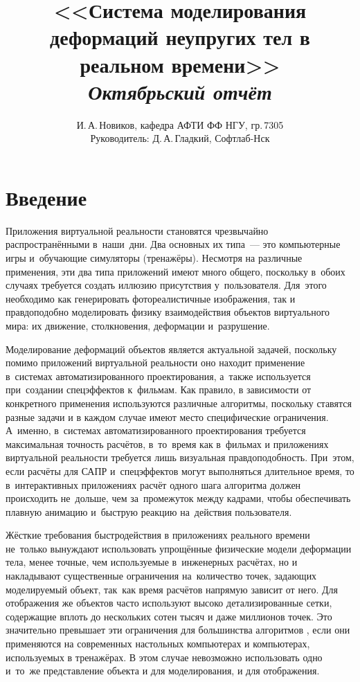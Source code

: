 \documentclass[a4paper,11pt]{report}
\author{И.\,А.\,Новиков, кафедра АФТИ ФФ НГУ, гр.\,7305\\ Руководитель: Д.\,А.\,Гладкий, Софтлаб-Нск}
\title{<<Система моделирования деформаций неупругих тел в реальном времени>>\\\itshape Октябрьский отчёт}
\begin{document}
  \maketitle
  \tableofcontents
  \chapter*{Введение}

    Приложения виртуальной реальности становятся чрезвычайно распространёнными в~наши~дни.  Два
    основных их типа~--- это компьютерные игры и~обучающие симуляторы (тренажёры). Несмотря на
    различные применения, эти два типа приложений имеют много общего, поскольку в~обоих случаях
    требуется создать иллюзию присутствия у~пользователя. Для~этого необходимо как генерировать
    фотореалистичные изображения, так и правдоподобно моделировать физику взаимодействия объектов
    виртуального мира: их движение, столкновения, деформации и~разрушение.

    Моделирование деформаций объектов является актуальной задачей, поскольку помимо приложений
    виртуальной реальности оно находит применение в~системах автоматизированного проектирования, а~также используется
    при~создании спецэффектов к~фильмам.  Как правило, в зависимости от конкретного применения
    используются различные алгоритмы, поскольку ставятся разные задачи и в каждом случае имеют место
    специфические ограничения. А~именно, в~системах автоматизированного проектирования требуется
    максимальная точность расчётов, в~то~время как в~фильмах и приложениях виртуальной реальности
    требуется лишь визуальная правдоподобность. При~этом, если расчёты для САПР и~спецэффектов могут
    выполняться длительное время, то в~интерактивных приложениях расчёт одного шага алгоритма должен
    происходить не~дольше, чем за~промежуток между кадрами, чтобы обеспечивать плавную анимацию
    и~быструю реакцию на~действия пользователя.

    Жёсткие требования быстродействия в приложениях реального времени не~только вынуждают
    использовать упрощённые физические модели деформации тела, менее точные, чем используемые
    в~инженерных расчётах, но и накладывают существенные ограничения на~количество точек, задающих
    моделируемый объект, так~как время расчётов напрямую зависит от него. Для отображения же
    объектов часто используют высоко детализированные сетки, содержащие вплоть до нескольких
    сотен тысяч и даже миллионов точек. Это значительно превышает эти ограничения для большинства
    алгоритмов \cite{muller-stable, muller-meshless, chang-crash}, если они применяются на
    современных настольных компьютерах и компьютерах, используемых в тренажёрах. В этом случае
    невозможно использовать одно и~то~же представление объекта и для моделирования, и для
    отображения.
\end{document}
